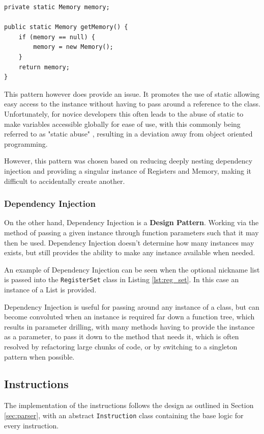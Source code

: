 \begin{lstlisting}[caption=Singleton pattern using within the \texttt{Memory} class, label=lst:singleton]
private static Memory memory;

public static Memory getMemory() {
    if (memory == null) {
        memory = new Memory();
    }
    return memory;
}
\end{lstlisting}

This pattern however does provide an issue. It promotes the use of static allowing easy access to the instance without having to pass around a reference to the class. Unfortunately, for novice developers this often leads to the abuse of static to make variables accessible globally for ease of use, with this commonly being referred to as "static abuse" \cite{zivkovic_2021_3}, resulting in a deviation away from object oriented programming.

However, this pattern was chosen based on reducing deeply nesting dependency injection and providing a singular instance of Registers and Memory, making it difficult to accidentally create another.

\subsubsection{Dependency Injection}
On the other hand, Dependency Injection is a \textbf{Design Pattern}. Working via the method of passing a given instance through function parameters such that it may then be used. Dependency Injection doesn't determine how many instances may exists, but still provides the ability to make any instance available when needed.

An example of Dependency Injection can be seen when the optional nickname list is passed into the \texttt{RegisterSet} class in Listing
\ref{lst:reg_set}. In this case an instance of a List is provided.

Dependency Injection is useful for passing around any instance of a class, but can become convoluted when an instance is required far down a function tree, which results in parameter drilling, with many methods having to provide the instance as a parameter, to pass it down to the method that needs it, which is often resolved by refactoring large chunks of code, or by switching to a singleton pattern when possible.

\subsection{Instructions}
The implementation of the instructions follows the design as outlined in Section \ref{sec:parser}, with an abstract \texttt{Instruction} class containing the base logic for every instruction. 

